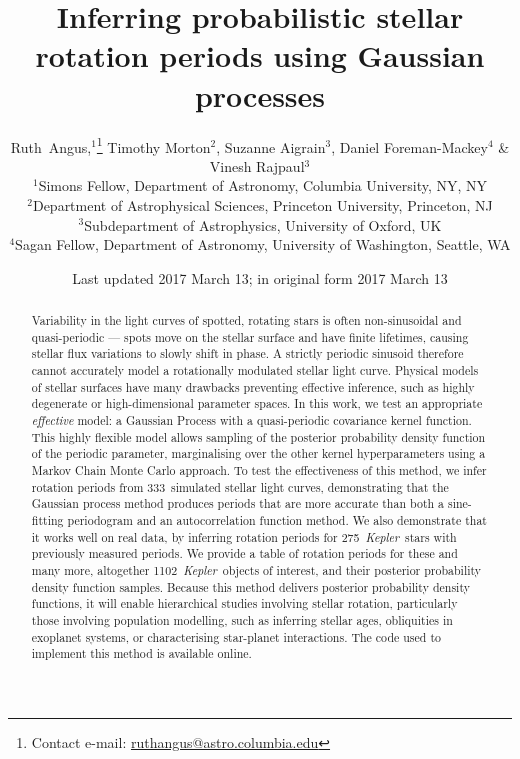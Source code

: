 \documentclass[a4paper,fleqn,usenatbib,useAMS]{mnras}
\title[GP rotation periods]{Inferring probabilistic stellar rotation periods
using Gaussian processes}
\author[R.~Angus \emph{et al.}]{
    Ruth~Angus,$^1$\thanks{Contact e-mail:
\href{mailto:ruthangus@astro.columbia.edu}{ruthangus@astro.columbia.edu}}
    Timothy Morton$^2$,
    Suzanne Aigrain$^3$,
    Daniel Foreman-Mackey$^4$
    \newauthor
    \& Vinesh Rajpaul$^3$
    \\
    $^1$Simons Fellow, Department of Astronomy, Columbia University, NY, NY \\
    $^2$Department of Astrophysical Sciences, Princeton University,
    Princeton, NJ \\
    $^3$Subdepartment of Astrophysics, University of Oxford, UK \\
    $^4$Sagan Fellow, Department of Astronomy, University of Washington,
    Seattle, WA}
\date{Last updated 2017 March 13; in original form 2017 March 13}
\newcommand{\response}[1]{{#1}}
\newcommand{\Kepler}{{\it Kepler}}
\newcommand{\LSST}{{\it LSST}}
\newcommand{\nkoi}{1102}
\newcommand{\naigrain}{333}
\newcommand{\nkoimcq}{275}
\begin{document}
\label{firstpage}
\pagerange{\pageref{firstpage}--\pageref{lastpage}}
\maketitle

\begin{abstract}
Variability in the light curves of spotted, rotating stars is often
    non-sinusoidal and quasi-periodic --- spots move on the stellar surface
    and have finite lifetimes, causing stellar flux variations to slowly shift
    in phase.
A strictly periodic sinusoid therefore cannot accurately model a rotationally
    modulated stellar light curve.
Physical models of stellar surfaces have many drawbacks preventing effective
    inference, such as highly degenerate or high-dimensional parameter spaces.
In this work, we test an appropriate {\it effective} model: a Gaussian
    Process with a quasi-periodic covariance kernel function.
This highly flexible model allows sampling of the posterior probability
    density function of the periodic parameter, marginalising over the
    other kernel hyperparameters using a Markov Chain Monte Carlo approach.
To test the effectiveness of this method, we infer rotation periods from
    \naigrain\ simulated stellar light curves, demonstrating that the Gaussian
    process method produces periods that are more accurate than both
    a sine-fitting periodogram and an autocorrelation function method.
We also demonstrate that it works well on real data, by inferring
    rotation periods for \nkoimcq\ \Kepler\ stars with previously measured
    periods.
    \response{We provide a table of rotation periods for these and many
    more, altogether \nkoi\ \Kepler\ objects of interest, and their posterior
    probability density function samples.}
Because this method delivers posterior probability density functions, it will
    enable hierarchical studies involving stellar rotation, particularly those
    involving population modelling, such as inferring stellar ages,
    obliquities in exoplanet systems, or characterising star-planet
    interactions.
    The code used to implement this method is available online.

\end{abstract}
\end{document}
